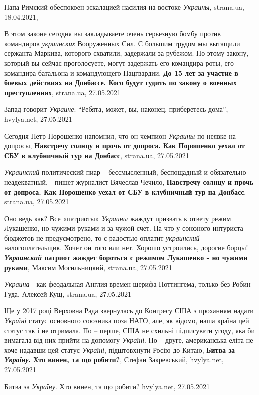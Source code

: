 Папа Римский обеспокоен эскалацией насилия на востоке \emph{Украины},
strana.ua, 18.04.2021,

В этом законе сегодня вы закладываете очень серьезную бомбу против командиров
\emph{украинских} Вооруженных Сил. С большим трудом мы вытащили сержанта Маркива,
которого схватили, задержали за рубежом. По этому закону, который вы сейчас
проголосуете, могут задержать его командира роты, его командира батальона и
командующего Нацгвардии, \textbf{До 15 лет за участие в боевых действиях на Донбассе. Кого будут судить по закону о военных преступлениях}, strana.ua, 27.05.2021

Запад говорит \emph{Украине}: \enquote{Ребята, может, вы, наконец, приберетесь
дома}, hvylya.net, 27.05.2021

Сегодня Петр Порошенко напомнил, что он чемпион \emph{Украины} по неявке на
допросы, \textbf{Навстречу солнцу и прочь от допроса. Как Порошенко уехал от
СБУ в клубничный тур на Донбасс}, strana.ua, 27.05.2021

\emph{Украинский} политический пиар – бессмысленный, беспощадный и обязательно
неадекватный, - пишет журналист Вячеслав Чечило, \textbf{Навстречу солнцу и
прочь от допроса. Как Порошенко уехал от СБУ в клубничный тур на Донбасс},
strana.ua, 27.05.2021

Оно ведь как? Все «патриоты» \emph{Украины} жаждут призвать к ответу режим
Лукашенко, но чужими руками и за чужой счет. На что у союзного интуриста
бюджетов не предусмотрено, то с радостью оплатит \emph{украинский}
налогоплательщик. Хочет он того или нет.  Хорошо устроились, дорогие борцы!
\textbf{\emph{Украинский} патриот жаждет бороться с режимом Лукашенко - но чужими
руками}, Максим Могильницкий, strana.ua, 27.05.2021

\emph{Украина} - как феодальная Англия времен шерифа Ноттингема, только без Робин
Гуда, Алексей Кущ, strana.ua, 27.05.2021

Ще у 2017 році Верховна Рада звернулась до Конгресу США з проханням надати
\emph{Україні} статус основного союзника поза НАТО, але, як відомо, наша країна
цей статус так і не отримала. По – перше, США не схильні підписувати угоду, яка
би вимагала від них прийти на допомогу \emph{Україні}. По – друге, американська
еліта не хоче надавши цей статус \emph{Україні}, підштовхнути Росію до Китаю,
\textbf{Битва за \emph{Україну}. Хто винен, та що робити?}, Стефан Закревський,
hvylya.net, 27.05.2021

Битва за \emph{Україну}. Хто винен, та що робити? hvylya.net, 27.05.2021

